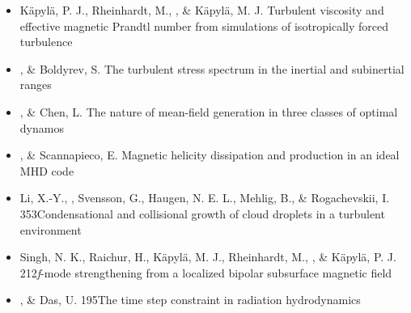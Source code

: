 \begin{itemize}
\item[{401.}~]
K\"apyl\"a, P. J., Rheinhardt, M., \Brandenburg, \& K\"apyl\"a, M. J.
{Turbulent viscosity and effective magnetic Prandtl number from simulations of isotropically forced turbulence}

\item[{400.}~]
\Brandenburg, \& Boldyrev, S.
{The turbulent stress spectrum in the inertial and subinertial ranges}

\item[{399.}~]
\Brandenburg, \& Chen, L.
{The nature of mean-field generation in three classes of optimal dynamos}

\item[{398.}~]
\Brandenburg, \& Scannapieco, E.
{Magnetic helicity dissipation and production in an ideal MHD code}

\item[{397.}~]
Li, X.-Y., \Brandenburg, Svensson, G., Haugen, N. E. L., Mehlig, B., \& Rogachevskii, I.
{353}{Condensational and collisional growth of cloud droplets in a turbulent environment}

\item[{396.}~]
Singh, N. K., Raichur, H., K\"apyl\"a, M. J., Rheinhardt, M., \Brandenburg, \& K\"apyl\"a, P. J.
{212}{{\em f}-mode strengthening from a localized bipolar subsurface magnetic field}

\item[{395.}~]
\Brandenburg, \& Das, U.
{195}{The time step constraint in radiation hydrodynamics}


\end{itemize}
